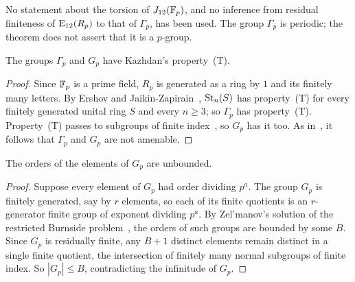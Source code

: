 No statement about the torsion of $J_{12}(\mathbb F_p)$, and no inference from residual finiteness of $\operatorname{E}_{12}(R_p)$ to that of
$\Gamma_p$, has been used. The group $\Gamma_p$ is periodic; the theorem does not assert that it is a $p$-group.

\begin{corollary}[Property (T)]\label{cor:det-T}
The groups $\Gamma_p$ and $G_p$ have Kazhdan's property~(T).
\end{corollary}

\begin{proof}
Since $\mathbb F_p$ is a prime field, $R_p$ is generated as a ring by $1$ and its finitely many letters. By Ershov and
Jaikin-Zapirain~\cite[Theorem~6.2]{ErshovJaikinZapirain2010}, $\operatorname{St}_n(S)$ has property~(T) for every finitely generated
unital ring $S$ and every $n\geq3$; so $\Gamma_p$ has property~(T). Property~(T) passes to subgroups of finite
index~\cite[Section~1.7]{BekkaHarpeValette2008}, so $G_p$ has it too. As in~\cite[Section~6.5]{OAI247periodic}, it follows
that $\Gamma_p$ and $G_p$ are not amenable.
\end{proof}

\begin{corollary}\label{cor:det-exponent}
The orders of the elements of $G_p$ are unbounded.
\end{corollary}

\begin{proof}
Suppose every element of $G_p$ had order dividing $p^a$. The group $G_p$ is finitely generated, say by $r$ elements, so
each of its finite quotients is an $r$-generator finite group of exponent dividing $p^a$. By Zel'manov's solution of the
restricted Burnside problem~\cite{ZelmanovOdd,ZelmanovTwo}, the orders of such groups are bounded by some $B$. Since
$G_p$ is residually finite, any $B+1$ distinct elements remain distinct in a single finite quotient, the intersection of
finitely many normal subgroups of finite index. So $|G_p|\leq B$, contradicting the infinitude of $G_p$.
\end{proof}
